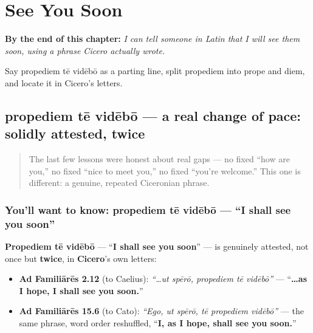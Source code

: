 
\chapter{See You Soon}
\label{ch:la-see-you-soon}

\begin{chapteropening}
\textbf{By the end of this chapter:} \emph{I can tell someone in Latin that I will see them soon, using a phrase Cicero actually wrote.}

Say propediem tē vidēbō as a parting line, split propediem into prope and diem, and locate it in Cicero's letters.
\end{chapteropening}

\section[propediem tē vidēbō]{propediem tē vidēbō — a real change of pace: solidly attested, twice}

\label{lesson:LA-C24-propediem-te-videbo}



\begin{quote}
The last few lessons were honest about real gaps — no fixed \textquotedblleft{}how are you,\textquotedblright{} no fixed \textquotedblleft{}nice to meet you,\textquotedblright{} no fixed \textquotedblleft{}you're welcome.\textquotedblright{} This one is different: a genuine, repeated Ciceronian phrase.
\end{quote}

\subsection*{You'll want to know: propediem tē vidēbō — \textquotedblleft{}I shall see you soon\textquotedblright{}}
\textbf{Propediem tē vidēbō} — \textquotedblleft{}\textbf{I shall see you soon}\textquotedblright{} — is genuinely attested, not once but \textbf{twice}, in \textbf{Cicero}'s own letters:

\begin{itemize}
\raggedright
  \item \textbf{Ad Familiārēs 2.12} (to Caelius): \emph{\textquotedblleft{}…ut spērō, propediem tē vidēbō\textquotedblright{}} — \textquotedblleft{}\textbf{…as I hope, I shall see you soon.}\textquotedblright{}
  \item \textbf{Ad Familiārēs 15.6} (to Cato): \emph{\textquotedblleft{}Ego, ut spērō, tē propediem vidēbō\textquotedblright{}} — the same phrase, word order reshuffled, \textquotedblleft{}\textbf{I, as I hope, shall see you soon.}\textquotedblright{}
\end{itemize}

